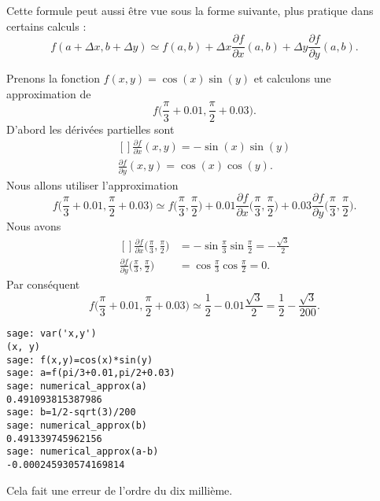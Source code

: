 Cette formule peut aussi être vue sous la forme suivante, plus pratique dans certains calculs :
\begin{equation}        \label{EqFormApproxfxyabDF}
    f(a+\Delta x,b+\Delta y)\simeq f(a,b)+\Delta x\frac{ \partial f }{ \partial x }(a,b)+\Delta y\frac{ \partial f }{ \partial y }(a,b).
\end{equation}

\begin{example}
    Prenons la fonction $f(x,y)=\cos(x)\sin(y)$ et calculons une approximation de
    \begin{equation}
        f\big( \frac{ \pi }{ 3 }+0.01,\frac{ \pi }{ 2 }+0.03 \big).
    \end{equation}
    D'abord les dérivées partielles sont
    \begin{equation}
        \begin{aligned}[]
            \frac{ \partial f }{ \partial x }(x,y)=-\sin(x)\sin(y)\\
            \frac{ \partial f }{ \partial y }(x,y)=\cos(x)\cos(y).
        \end{aligned}
    \end{equation}
    Nous allons utiliser l'approximation
    \begin{equation}
        f\big( \frac{ \pi }{ 3 }+0.01,\frac{ \pi }{ 2 }+0.03 \big)\simeq f\big( \frac{ \pi }{ 3 },\frac{ \pi }{2} \big)+0.01\frac{ \partial f }{ \partial x }\big( \frac{ \pi }{ 3 },\frac{ \pi }{2} \big)+0.03\frac{ \partial f }{ \partial y }\big( \frac{ \pi }{ 3 },\frac{ \pi }{2} \big).
    \end{equation}
    Nous avons
    \begin{equation}
        \begin{aligned}[]
            \frac{ \partial f }{ \partial x }\big( \frac{ \pi }{ 3 },\frac{ \pi }{2} \big)&=-\sin\frac{ \pi }{ 3 }\sin\frac{ \pi }{ 2 }=-\frac{ \sqrt{3} }{2}\\
            \frac{ \partial f }{ \partial y }\big( \frac{ \pi }{ 3 },\frac{ \pi }{2} \big)&=\cos\frac{ \pi }{ 3 }\cos\frac{ \pi }{ 2 }=0.
        \end{aligned}
    \end{equation}
    Par conséquent
    \begin{equation}
        f\big( \frac{ \pi }{ 3 }+0.01,\frac{ \pi }{ 2 }+0.03 \big)\simeq \frac{ 1 }{2}-0.01\frac{ \sqrt{3} }{2}=\frac{ 1 }{2}-\frac{ \sqrt{3} }{ 200 }.
    \end{equation}

    \begin{verbatim}
sage: var('x,y')
(x, y)
sage: f(x,y)=cos(x)*sin(y)
sage: a=f(pi/3+0.01,pi/2+0.03)
sage: numerical_approx(a)
0.491093815387986
sage: b=1/2-sqrt(3)/200
sage: numerical_approx(b)
0.491339745962156
sage: numerical_approx(a-b)
-0.000245930574169814
    \end{verbatim}
    Cela fait une erreur de l'ordre du dix millième.

\end{example}

